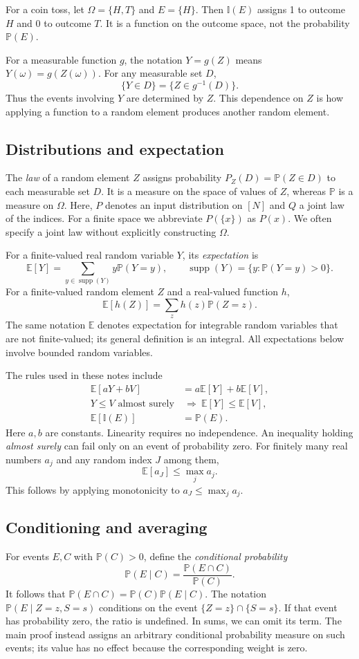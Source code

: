 \documentclass[11pt,twoside]{article}
\newcommand{\I}{\mathbb I}
\renewcommand{\P}{\mathbb P}
\theoremstyle{definition}
\theoremstyle{remark}
\begin{document}
For a coin toss, let $\Omega=\{H,T\}$ and $E=\{H\}$. Then $\I(E)$ assigns
1 to outcome $H$ and 0 to outcome $T$. It is a function on the outcome space,
not the probability $\P(E)$.

For a measurable function $g$, the notation $Y=g(Z)$ means
$Y(\omega)=g(Z(\omega))$. For any measurable set $D$,
\[
\{Y\in D\}=\{Z\in g^{-1}(D)\}.
\]
Thus the events involving $Y$ are determined by $Z$. This dependence on $Z$
is how applying a function to a random element produces another random element.

\subsection{Distributions and expectation}
The \emph{law} of a random element $Z$ assigns probability
$P_Z(D)=\P(Z\in D)$ to each measurable set $D$. It is a measure on the
space of values of $Z$, whereas $\P$ is a measure on $\Omega$.
Here, $P$ denotes an input distribution on $[N]$ and $Q$ a joint
law of the indices. For a finite space we abbreviate $P(\{x\})$ as $P(x)$.
We often specify a joint law without explicitly constructing $\Omega$.

For a finite-valued real random variable $Y$, its \emph{expectation} is
\[
\mathbb E[Y]=\sum_{y\in\operatorname{supp}(Y)}y\P(Y=y),
\qquad \operatorname{supp}(Y)=\{y:\P(Y=y)>0\}.
\]
For a finite-valued random element $Z$ and a real-valued function $h$,
\[
\mathbb E[h(Z)]=\sum_z h(z)\P(Z=z).
\]
The same notation $\mathbb E$ denotes expectation for integrable random
variables that are not finite-valued; its general definition is an integral.
All expectations below involve bounded random variables.

The rules used in these notes include
\begin{align*}
\mathbb E[aY+bV]&=a\mathbb E[Y]+b\mathbb E[V],\\
Y\le V\text{ almost surely}&\ \Longrightarrow\
\mathbb E[Y]\le\mathbb E[V],\\
\mathbb E[\I(E)]&=\P(E).
\end{align*}
Here $a,b$ are constants. Linearity requires no independence. An inequality
holding \emph{almost surely} can fail only on an event of probability zero.
For finitely many real numbers $a_j$ and any random index $J$ among them,
\[
\mathbb E[a_J]\le\max_j a_j.
\]
This follows by applying monotonicity to $a_J\le\max_j a_j$.

\subsection{Conditioning and averaging}
For events $E,C$ with $\P(C)>0$, define the \emph{conditional probability}
\[
\P(E\mid C)=\frac{\P(E\cap C)}{\P(C)}.
\]
It follows that $\P(E\cap C)=\P(C)\P(E\mid C)$.
The notation $\P(E\mid Z=z,S=s)$ conditions on the event
$\{Z=z\}\cap\{S=s\}$. If that event has probability zero, the ratio is
undefined. In sums, we can omit its term. The main proof instead assigns an
arbitrary conditional probability measure on such events; its value has no
effect because the corresponding weight is zero.
\end{document}
